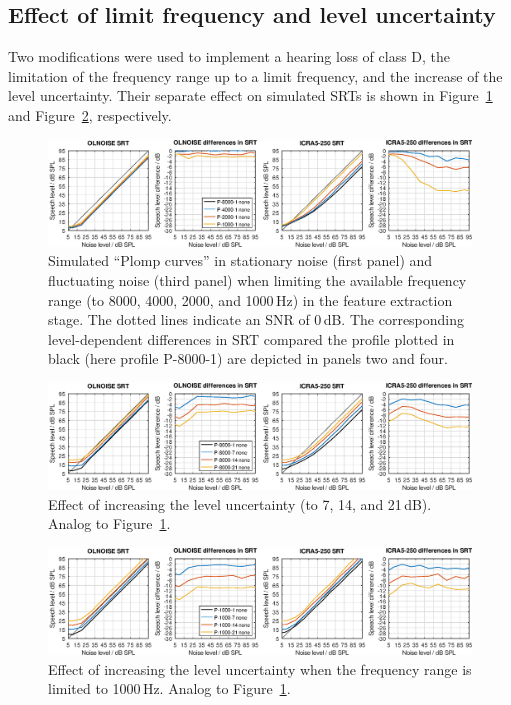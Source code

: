 \documentclass[10pt,a4paper,twocolumn]{article}
\begin{document}
\subsection*{Effect of limit frequency and level uncertainty}
%
Two modifications were used to implement a hearing loss of class D, the limitation of the frequency range up to a limit frequency, and the increase of the level uncertainty.
%
Their separate effect on simulated SRTs is shown in Figure~\ref{fig:12} and Figure~\ref{fig:13}, respectively.
%
\begin{figure}[h!]
	\centerline{\includegraphics[width=\textwidth]{images/SRTs-frequencyrange}}
	\caption{Simulated \enquote{Plomp curves} in stationary noise (first panel) and fluctuating noise (third panel) when limiting the available frequency range (to 8000, 4000, 2000, and 1000\,Hz) in the feature extraction stage.
	The dotted lines indicate an SNR of 0\,dB.
	The corresponding level-dependent differences in SRT compared the profile plotted in black (here profile P-8000-1) are depicted in panels two and four.
	}
	\label{fig:12}
\end{figure}
%
\begin{figure}[h!]
	\centerline{\includegraphics[width=\textwidth]{images/SRTs-leveluncertainty}}
	\caption{Effect of increasing the level uncertainty (to 7, 14, and 21\,dB). Analog to Figure~\ref{fig:12}.}
	\label{fig:13}
\end{figure}
%
\begin{figure}[h!]
	\centerline{\includegraphics[width=\textwidth]{images/SRTs-leveluncertainty-with-frequencyrange}}
	\caption{Effect of increasing the level uncertainty when the frequency range is limited to 1000\,Hz. Analog to Figure~\ref{fig:12}.}
	\label{fig:14}
\end{figure}
\end{document}
